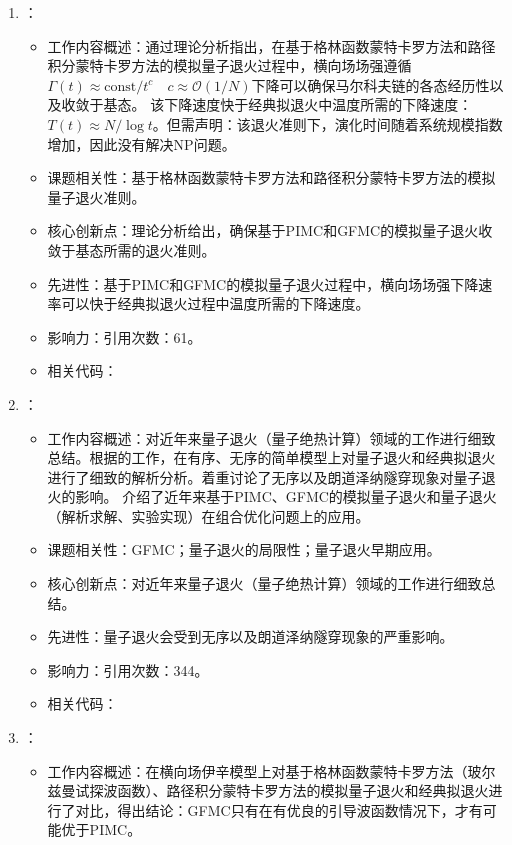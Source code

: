 \begin{enumerate}
            \item \citet{morita2006convergence}：
            \begin{itemize}
                \item 工作内容概述：通过理论分析指出，在基于格林函数蒙特卡罗方法和路径积分蒙特卡罗方法的模拟量子退火过程中，横向场场强遵循$\Gamma(t)\approx \text{const}/t^c \quad c\approx \mathcal{O}(1/N)$下降可以确保马尔科夫链的各态经历性以及收敛于基态。
                该下降速度快于经典拟退火中温度所需的下降速度：$T(t)\approx N/\log t$。但需声明：该退火准则下，演化时间随着系统规模指数增加，因此没有解决NP问题。
                \item 课题相关性：基于格林函数蒙特卡罗方法和路径积分蒙特卡罗方法的模拟量子退火准则。
                \item 核心创新点：理论分析给出，确保基于PIMC和GFMC的模拟量子退火收敛于基态所需的退火准则。
                \item 先进性：基于PIMC和GFMC的模拟量子退火过程中，横向场场强下降速率可以快于经典拟退火过程中温度所需的下降速度。
                \item 影响力：引用次数：61。
                \item 相关代码：
            \end{itemize}
        \item \citet{santoro2006optimization}：
        \begin{itemize}
            \item 工作内容概述：对近年来量子退火（量子绝热计算）领域的工作进行细致总结。根据\citet{stella2005optimization}的工作，在有序、无序的简单模型上对量子退火和经典拟退火进行了细致的解析分析。着重讨论了无序以及朗道泽纳隧穿现象对量子退火的影响。
            介绍了近年来基于PIMC、GFMC的模拟量子退火和量子退火（解析求解、实验实现）在组合优化问题上的应用。
            \item 课题相关性：GFMC；量子退火的局限性；量子退火早期应用。
            \item 核心创新点：对近年来量子退火（量子绝热计算）领域的工作进行细致总结。
            \item 先进性：量子退火会受到无序以及朗道泽纳隧穿现象的严重影响。
            \item 影响力：引用次数：344。
            \item 相关代码：
        \end{itemize}
        \item \citet{stella2007quantum}：
            \begin{itemize}
                \item 工作内容概述：在横向场伊辛模型上对基于格林函数蒙特卡罗方法（玻尔兹曼试探波函数）、路径积分蒙特卡罗方法的模拟量子退火和经典拟退火进行了对比，得出结论：GFMC只有在有优良的引导波函数情况下，才有可能优于PIMC。

\end{itemize}
\end{enumerate}
